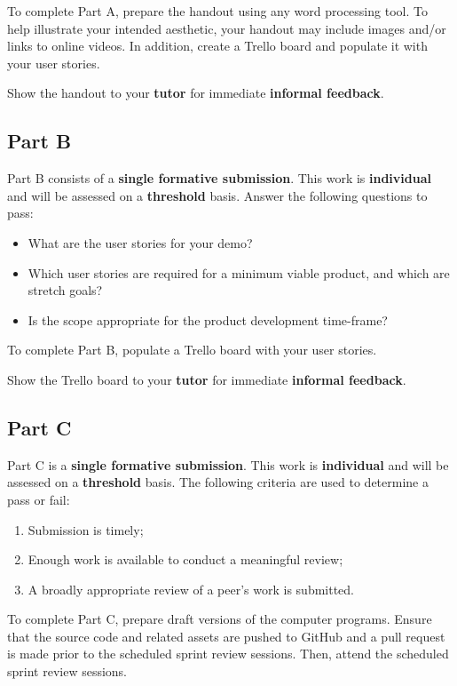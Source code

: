 \documentclass{../../fal_assignment}
\begin{document}
To complete Part A, prepare the handout using any word processing tool.
To help illustrate your intended aesthetic, your handout may include images and/or links to online videos.
In addition, create a Trello board and populate it with your user stories.

Show the handout to your \textbf{tutor} for immediate \textbf{informal feedback}.

\subsection*{Part B}

Part B consists of a \textbf{single formative submission}. This work is \textbf{individual} and will be assessed on a \textbf{threshold} basis. Answer the following questions to pass:

\begin{itemize}
	\item What are the user stories for your demo?
	\item Which user stories are required for a minimum viable product, and which are stretch goals?
	\item Is the scope appropriate for the product development time-frame?
\end{itemize}

To complete Part B, populate a Trello board with your user stories.

Show the Trello board to your \textbf{tutor} for immediate \textbf{informal feedback}.

\subsection*{Part C}

Part C is a \textbf{single formative submission}. This work is \textbf{individual} and will be assessed on a \textbf{threshold} basis. The following criteria are used to determine a pass or fail:

\begin{enumerate}[label=(\alph*)]
	\item Submission is timely;
	\item Enough work is available to conduct a meaningful review;
	\item A broadly appropriate review of a peer's work is submitted.
\end{enumerate}

To complete Part C, prepare draft versions of the computer programs. Ensure that the source code and related assets are pushed to GitHub and a pull request is made prior to the scheduled sprint review sessions. Then, attend the scheduled sprint review sessions.
\end{document}

